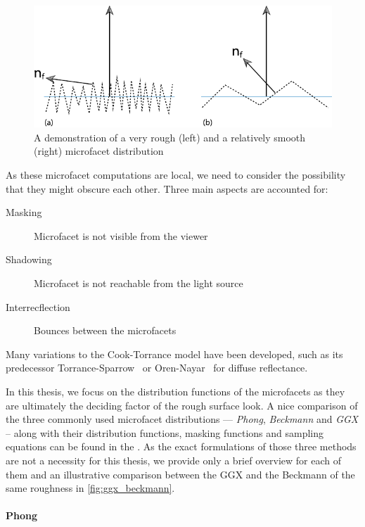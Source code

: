 \begin{figure}[h]
	\centering
	\includegraphics[width=.8\linewidth]{img/microfacets.pdf}
	\caption{A demonstration of a very rough (left) and a relatively smooth (right) microfacet distribution~\cite{pharr2016physically}}
	\label{fig:microfacets}
\end{figure}

As these microfacet computations are local, we need to consider the possibility that they might obscure each other. Three main aspects are accounted for:
\begin{description}
	\item[Masking] Microfacet is not visible from the viewer
	\item[Shadowing] Microfacet is not reachable from the light source
	\item[Interrecflection] Bounces between the microfacets
\end{description}

Many variations to the Cook-Torrance model have been developed, such as its predecessor Torrance-Sparrow~\cite{Torrance1967TheoryFO} or Oren-Nayar~\cite{oren1994generalization} for diffuse reflectance.

In this thesis, we focus on the distribution functions of the microfacets as they are ultimately the deciding factor of the rough surface look. A nice comparison of the three commonly used microfacet distributions --- \emph{Phong}, \emph{Beckmann} and \emph{GGX} -- along with their distribution functions, masking functions and sampling equations can be found in the \citet{walter2007microfacet}. As the exact formulations of those three methods are not a necessity for this thesis, we provide only a brief overview for each of them and an illustrative comparison between the GGX and the Beckmann of the same roughness in 
\autoref{fig:ggx_beckmann}.

\paragraph{Phong}

